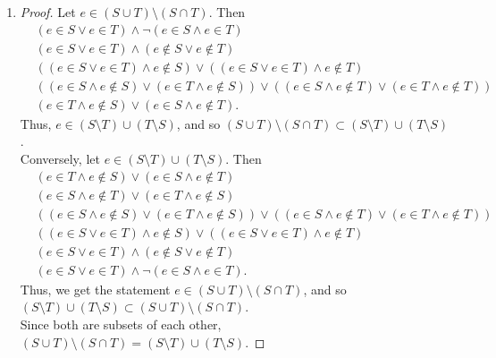 \documentclass{homework}
\begin{document}
\begin{solution}
\begin{enumerate}[label=(\alph*)]
  \item 
    \begin{proof}[Proof]
      Let $e\in \left( S\cup T \right) \setminus \left( S\cap T \right) $. Then
      \begin{align*}
        &\left( e\in S\lor e\in T \right) \land \neg \left( e\in S\land e\in T \right) \\
        &\left( e\in S\lor e\in T \right) \land \left( e\not\in S\lor e\not\in T \right) \\
        &\left( \left( e\in S\lor e\in T \right) \land e\not\in S \right) \lor \left( 
        \left( e\in S\lor e\in T \right)\land e\not\in T\right) \\
        &\left( \left( e\in S\land e\not\in S \right) \lor \left( e\in T\land e\not\in S \right)
        \right) \lor \left( \left(  e\in S\land e\not\in T \right) \lor \left( e\in T\land e\not\in
      T\right) \right) \\
        &\left( e\in T\land e\not\in S \right) \lor \left( e\in S\land e\not\in T \right) 
      .\end{align*}
      Thus, $e\in \left( S\setminus T \right) \cup \left( T\setminus S \right) $, and so $\left( S\cup T \right)
      \setminus \left( S\cap T \right) \subset \left( S\setminus T \right) \cup \left( T\setminus S \right) $.\\
      Conversely, let $e\in \left( S\setminus T \right) \cup \left( T\setminus S \right) $. Then
      \begin{align*}
        &\left( e\in T\land e\not\in S \right) \lor \left( e\in S\land e\not\in T \right) \\
        &\left( e\in S\land e\not\in T \right) \lor \left( e\in T\land e\not\in S \right) \\
        &\left( \left( e\in S\land e\not\in S \right) \lor \left( e\in T\land e\not\in S \right)
        \right) \lor \left( \left(  e\in S\land e\not\in T \right) \lor \left( e\in T\land e\not\in
      T\right) \right) \\
        &\left( \left( e\in S\lor e\in T \right) \land e\not\in S \right) \lor \left( 
        \left( e\in S\lor e\in T \right)\land e\not\in T\right) \\
        &\left( e\in S\lor e\in T \right) \land \left( e\not\in S\lor e\not\in T \right) \\
        &\left( e\in S\lor e\in T \right) \land \neg \left( e\in S\land e\in T \right)
      .\end{align*}
      Thus, we get the statement 
      $e\in \left( S\cup T \right) \setminus \left( S\cap T\right) $, and so $\left( S\setminus 
      T \right) \cup \left( T\setminus S \right) \subset \left( S\cup T \right) \setminus \left(
    S\cap T \right) $.\\
      Since both are subsets of each other, $\left( S\cup T \right) \setminus \left( S\cap T \right)
      = \left( S\setminus T \right) \cup \left( T\setminus S \right)$.
    \end{proof}
\end{enumerate}


\end{solution}
\end{document}
